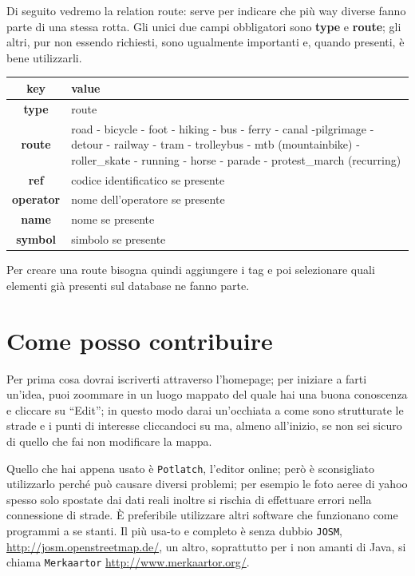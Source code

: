 \documentclass[a4paper,twoside,12pt,]{article}
\newcommand{\key}[1]{\textsf{\textbf{#1}}}
\newcommand{\val}[1]{\textsf{#1}}
\newcommand{\soft}[1]{\texttt{#1}}
\begin{document}
Di seguito vedremo la relation route: serve per indicare che più way diverse fanno parte di una stessa rotta. Gli unici due campi obbligatori sono \key{type} e \key{route}; gli altri, pur non essendo richiesti, sono ugualmente importanti e, quando presenti, è bene utilizzarli.
\begin{center}
 \begin{tabular}{cp{9cm}}
  \toprule
   \textbf{key} & \textbf{value} \\
  \midrule
   \key{type} & \val{route} \\
   \key{route} & \val{road} - \val{bicycle} - \val{foot} - \val{hiking} - \val{bus} - \val{ferry} - \val{canal} -\val{pilgrimage} - \val{detour} - \val{railway} - \val{tram} - \val{trolleybus} - \val{mtb (mountainbike)} - \val{roller\_skate} - \val{running} - \val{horse} - \val{parade} - \val{protest\_march (recurring)} \\
   \key{ref} & \val{codice identificatico se presente}\\
   \key{operator} & \val{nome dell'operatore se presente} \\
   \key{name} & \val{nome se presente} \\
   \key{symbol} & \val{simbolo se presente} \\
  \bottomrule
\end{tabular}
\end{center}
Per creare una route bisogna quindi aggiungere i tag e poi selezionare quali elementi già presenti sul database ne fanno parte.

\section{Come posso contribuire}
Per prima cosa dovrai iscriverti attraverso l'homepage; per iniziare a farti un'idea, puoi zoommare in un luogo mappato del quale hai una buona conoscenza e cliccare su ``Edit''; in questo modo darai un'occhiata a come sono strutturate le strade e i punti di interesse cliccandoci su ma, almeno all'inizio, se non sei sicuro di quello che fai non modificare la mappa.

Quello che hai appena usato è \soft{Potlatch}, l'editor online; però è sconsigliato utilizzarlo perché può causare diversi problemi; per esempio le foto aeree di yahoo spesso solo spostate dai dati reali inoltre si rischia di effettuare errori nella connessione di strade. È preferibile utilizzare altri software che funzionano come programmi a se stanti. Il più usa-to e completo è senza dubbio \soft{JOSM}, \url{http://josm.openstreetmap.de/}, un altro, soprattutto per i non amanti di Java, si chiama \soft{Merkaartor} \url{http://www.merkaartor.org/}.
\end{document}
